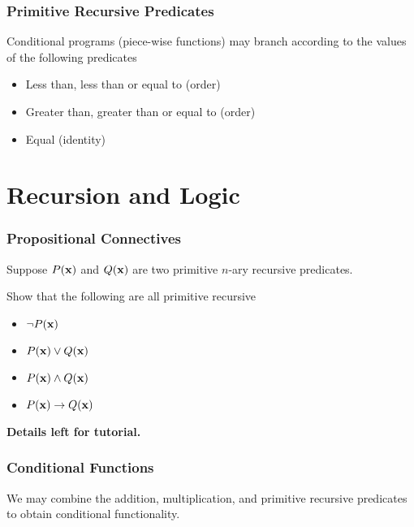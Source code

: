 \documentclass{beamer}
\begin{document}
\begin{frame}
	\frametitle{Primitive Recursive Predicates}

	Conditional programs (piece-wise functions) may branch according to the values of the following predicates

	\vspace{0.5cm}

	\begin{itemize}
		\item Less than, less than or equal to (order)
		\item Greater than, greater than or equal to (order)
		\item Equal (identity)
	\end{itemize}

	\vspace{5cm}

\end{frame}


\section{Recursion and Logic}
\begin{frame}
	\frametitle{Propositional Connectives}

	Suppose $P({\bf x})$ and $Q({\bf x})$ are two primitive $n$-ary recursive predicates.

	\vspace{0.5cm}

	Show that the following are all primitive recursive

	\begin{itemize}
		\item[] $\lnot P({\bf x})$
		\item[] $P({\bf x}) \lor Q({\bf x})$ 
		\item[] $P({\bf x}) \land Q({\bf x})$ 
		\item[] $P({\bf x}) \to Q({\bf x})$
	\end{itemize}

	\vspace{3.8cm}

	\hspace{6cm} {\bf Details left for tutorial.}

\end{frame}



\begin{frame}
	\frametitle{Conditional Functions}

	We may combine the addition, multiplication, and primitive recursive predicates to obtain conditional functionality. 

	\vspace{7cm}

\end{frame}
\end{document}
